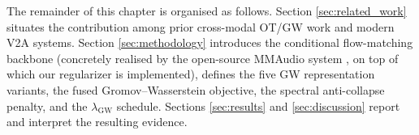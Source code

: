 The remainder of this chapter is organised as follows. Section
\ref{sec:related_work} situates the contribution among prior
cross-modal OT/GW work and modern V2A systems. Section
\ref{sec:methodology} introduces the conditional flow-matching
backbone (concretely realised by the open-source MMAudio system
\citep{cheng_2025_mmaudio}, on top of which our regularizer is
implemented), defines the five GW representation variants, the
fused Gromov--Wasserstein objective, the spectral anti-collapse
penalty, and the $\lambda_{\mathrm{GW}}$ schedule. Sections
\ref{sec:results} and \ref{sec:discussion} report and interpret
the resulting evidence.
